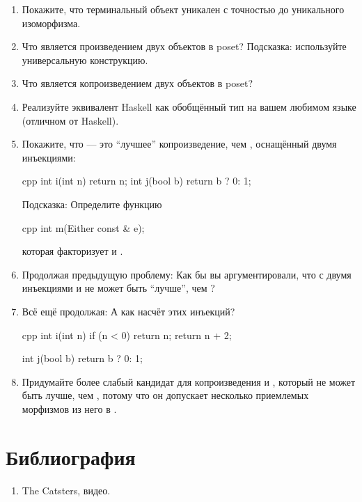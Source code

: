 \begin{enumerate}
  \tightlist
  \item
        Покажите, что терминальный объект уникален с точностью до уникального изоморфизма.
  \item
        Что является произведением двух объектов в poset? Подсказка: используйте универсальную
        конструкцию.
  \item
        Что является копроизведением двух объектов в poset?
  \item
        Реализуйте эквивалент Haskell  как обобщённый тип
        на вашем любимом языке (отличном от Haskell).
  \item
        Покажите, что  --- это ``лучшее'' копроизведение, чем ,
        оснащённый двумя инъекциями:

        \begin{snip}{cpp}
int i(int n) { return n; }
int j(bool b) { return b ? 0: 1; }
\end{snip}

        Подсказка: Определите функцию

        \begin{snip}{cpp}
int m(Either const & e);
\end{snip}

        которая факторизует  и .
  \item
        Продолжая предыдущую проблему: Как бы вы аргументировали, что 
        с двумя инъекциями  и  не может быть ``лучше'',
        чем ?
  \item
        Всё ещё продолжая: А как насчёт этих инъекций?

        \begin{snip}{cpp}
int i(int n) {
    if (n < 0) return n;
    return n + 2;
}

int j(bool b) { return b ? 0: 1; }
\end{snip}
  \item
        Придумайте более слабый кандидат для копроизведения  и
        , который не может быть лучше, чем , потому что он
        допускает несколько приемлемых морфизмов из него в .
\end{enumerate}

\section{Библиография}

\begin{enumerate}
  \tightlist
  \item
        The Catsters,
         видео.
\end{enumerate}
